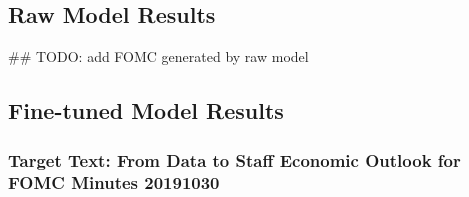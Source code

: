 \subsection{Raw Model Results}
## TODO: add FOMC generated by raw model





\subsection{Fine-tuned Model Results}

\subsubsection{Target Text: From Data to Staff Economic Outlook for FOMC Minutes 20191030}\label{target_text}

